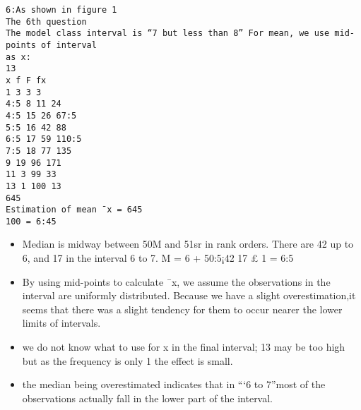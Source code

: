 \documentclass[a4paper,12pt]{article}
\begin{document}
\begin{verbatim}
6:As shown in figure 1
The 6th question
The model class interval is “7 but less than 8” For mean, we use mid-points of interval
as x:
13
x f F fx
1 3 3 3
4:5 8 11 24
4:5 15 26 67:5
5:5 16 42 88
6:5 17 59 110:5
7:5 18 77 135
9 19 96 171
11 3 99 33
13 1 100 13
645
Estimation of mean ¯x = 645
100 = 6:45

\end{verbatim}
\begin{itemize}
    \item Median is midway between 50M and 51sr in rank orders. There are 42 up to 6, and 17
in the interval 6 to 7.
M = 6 + 50:5¡42
17 £ 1 = 6:5
\item By using mid-points to calculate ¯x, we assume the observations in the interval are uniformly
distributed. Because we have a slight overestimation,it seems that there was a
slight tendency for them to occur nearer the lower limits of intervals. 
\item we do not know
what to use for x in the final interval; 13 may be too high but as the frequency is only
1 the effect is small.
\item the median being overestimated indicates that in “‘6 to 7”most of
the observations actually fall in the lower part of the interval.
\end{itemize}
\end{document}

